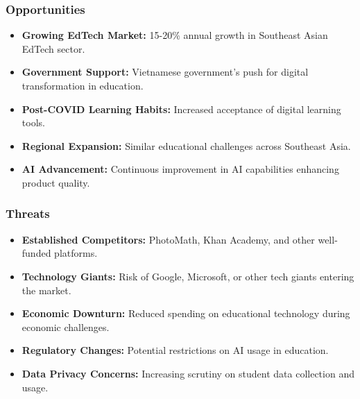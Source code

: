 \subsubsection{Opportunities}
\begin{itemize}
    \item \textbf{Growing EdTech Market:} 15-20\% annual growth in Southeast Asian EdTech sector.
    \item \textbf{Government Support:} Vietnamese government's push for digital transformation in education.
    \item \textbf{Post-COVID Learning Habits:} Increased acceptance of digital learning tools.
    \item \textbf{Regional Expansion:} Similar educational challenges across Southeast Asia.
    \item \textbf{AI Advancement:} Continuous improvement in AI capabilities enhancing product quality.
\end{itemize}

\subsubsection{Threats}
\begin{itemize}
    \item \textbf{Established Competitors:} PhotoMath, Khan Academy, and other well-funded platforms.
    \item \textbf{Technology Giants:} Risk of Google, Microsoft, or other tech giants entering the market.
    \item \textbf{Economic Downturn:} Reduced spending on educational technology during economic challenges.
    \item \textbf{Regulatory Changes:} Potential restrictions on AI usage in education.
    \item \textbf{Data Privacy Concerns:} Increasing scrutiny on student data collection and usage.
\end{itemize}